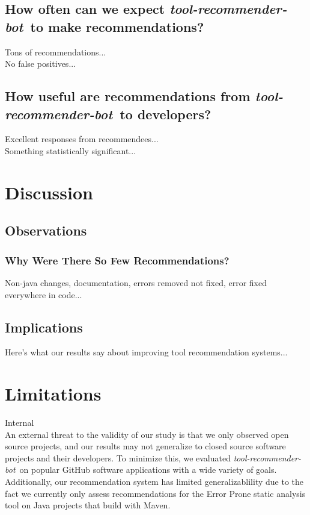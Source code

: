 \documentclass[sigconf,review,anonymous]{acmart}
\newcommand{\tool}{\textsl{tool-recommender-bot}}
\begin{document}
\subsection{How often can we expect \tool~to make recommendations?}

Tons of recommendations... \\

No false positives...

\subsection{How useful are recommendations from \tool~to developers?}

Excellent responses from recommendees...\\

Something statistically significant...

\section{Discussion}

\subsection{Observations}

\subsubsection{Why Were There So Few Recommendations?}

Non-java changes, documentation, errors removed not fixed, error fixed everywhere in code...

\subsection{Implications}

Here's what our results say about improving tool recommendation systems...

\section{Limitations}

Internal\\

An external threat to the validity of our study is that we only observed open source projects, and our results may not generalize to closed source software projects and their developers. To minimize this, we evaluated \tool~on popular GitHub software applications with a wide variety of goals. Additionally, our recommendation system has limited generalizablility due to the fact we currently only assess recommendations for the Error Prone static analysis tool on Java projects that build with Maven.
\end{document}
